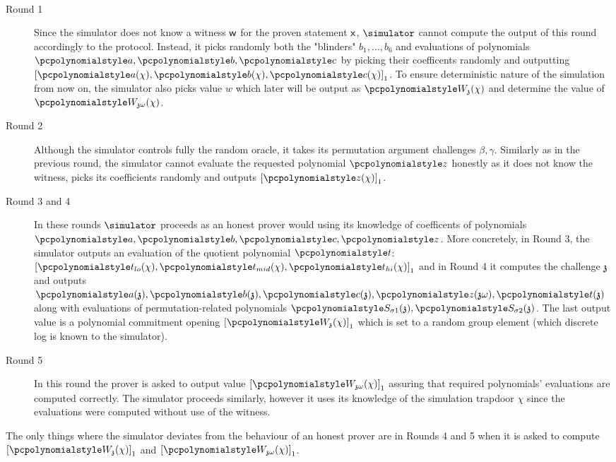 \documentclass[runningheads,11pt]{llncs}
\theoremstyle{definition}
\begin{document}
\paragraph{}
\begin{description}
	\item[Round 1]
	Since the simulator does not know a witness $\mathsf{w}$ for the proven statement $\mathsf{x}$, $\simulator$ cannot compute the output of this round accordingly to the protocol. Instead, it picks randomly both the "blinders" $b_1, \ldots, b_6$ and evaluations of polynomials $\p{a}, \p{b}, \p{c}$ by picking their coefficents randomly and outputting $\gone{\p{a}(\chi), \p{b}(\chi), \p{c}(\chi)}$.
	To ensure deterministic nature of the simulation from now on, the simulator also picks value $w$ which later will be output as $\p{W}_\chz(\chi)$ and determine the value of $\p{W}_{\chz \omega}(\chi)$.
	\item[Round 2]
	Although the simulator controls fully the random oracle, it takes its permutation argument challenges $\beta, \gamma$.
	Similarly as in the previous round, the simulator cannot evaluate the requested polynomial $\p{z}$ honestly as it does not know the witness, picks its coefficients randomly and outputs $\gone{\p{z}(\chi)}$.
	\item[Round 3 and 4]
	In these rounds $\simulator$ proceeds as an honest prover would using its knowledge of coefficents of polynomials $\p{a}, \p{b}, \p{c}, \p{z}$.
	More concretely, in Round 3, the simulator outputs an evaluation of the quotient polynomial $\p{t}$: $\gone{\p{t}_{lo}(\chi), \p{t}_{mid}(\chi), \p{t}_{hi}(\chi)}$ and in
	Round 4 it computes the challenge $\mathfrak{z}$ and outputs $\p{a}(\chz), \p{b}(\chz), \p{c}(\chz), \p{z}(\chz \omega), \p{t}(\chz)$ along with evaluations of permutation-related polynomials $\p{S_{\sigma 1}(\chz)}, \p{S_{\sigma 2}(\chz)}$. 
	The last output value is a polynomial commitment opening $\gone{\p{W}_{\chz}(\chi)}$ which is set to a random group element (which discrete log is known to the simulator).
	\item[Round 5]
	In this round the prover is asked to output value $\gone{\p{W}_{\chz \omega}(\chi)}$ assuring that required polynomials' evaluations are computed correctly. The simulator proceeds similarly, however it uses its knowledge of the simulation trapdoor $\chi$ since the evaluations were computed without use of the witness.
\end{description}
	The only things where the simulator deviates from the behaviour of an honest prover are in Rounds 4 and 5 when it is asked to compute $\gone{\p{W}_{\chz}(\chi)}$ and $\gone{\p{W}_{\chz \omega}(\chi)}$. 
\end{document}
